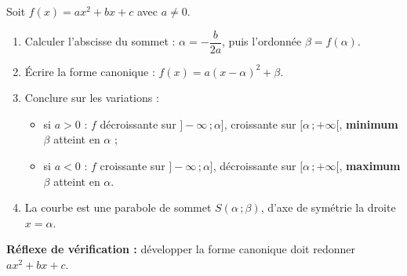 \documentclass[11pt]{article}
\newcommand{\cle}[1]{{\popxbold\color{popdark}#1}}
\begin{document}
\begin{methode}
Soit $f(x)=ax^2+bx+c$ avec $a\neq 0$.
\begin{enumerate}
\item Calculer l'abscisse du sommet : $\alpha=-\dfrac{b}{2a}$, puis l'ordonnée $\beta=f(\alpha)$.
\item Écrire la \cle{forme canonique} : $f(x)=a(x-\alpha)^2+\beta$.
\item Conclure sur les variations :
\begin{itemize}
\item si $a>0$ : $f$ décroissante sur $]-\infty\,;\alpha]$, croissante sur $[\alpha\,;+\infty[$, \textbf{minimum} $\beta$ atteint en $\alpha$ ;
\item si $a<0$ : $f$ croissante sur $]-\infty\,;\alpha]$, décroissante sur $[\alpha\,;+\infty[$, \textbf{maximum} $\beta$ atteint en $\alpha$.
\end{itemize}
\item La courbe est une \cle{parabole} de sommet $S(\alpha\,;\beta)$, d'axe de symétrie la droite $x=\alpha$.
\end{enumerate}
\textbf{Réflexe de vérification :} développer la forme canonique doit redonner $ax^2+bx+c$.
\end{methode}
\end{document}
